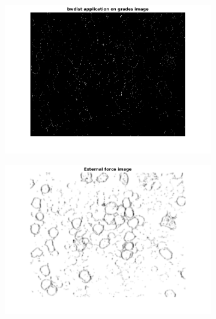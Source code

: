 \begin{figure}[htbp]
\begin{subfigure}[b]{0.45\textwidth}
        \caption{ }
        \label{fig:fig}
    \end{subfigure}
    \begin{subfigure}[b]{0.45\textwidth}
        \includegraphics[width=\textwidth]{img/final/figure3.png}
        \caption{ }
        \label{fig:fig3}
    \end{subfigure}
    \begin{subfigure}[b]{0.45\textwidth}
        \includegraphics[width=\textwidth]{img/final/figure4.png}
        \caption{ }
        \label{fig:fig4}
    \end{subfigure}
    \begin{subfigure}[b]{0.45\textwidth}

\end{subfigure}
\end{figure}
